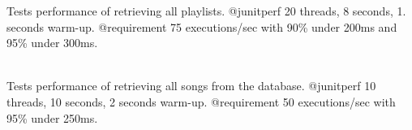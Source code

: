 \begin{DoxyRefList}
\label{test__test000076}%
%
Tests performance of retrieving all playlists. @junitperf 20 threads, 8 seconds, 1. seconds warm-\/up. @requirement 75 executions/sec with 90\% under 200ms and 95\% under 300ms.  
\item[{\parbox[t]{\linewidth}{Member \doxylink{classcom_1_1deusto_1_1deuspotify_1_1_deuspotify_perf_i_t_aeb6d9d92daf7457d86ee5d20a166aa72}{com.deusto.deuspotify.Deuspotify\+Perf\+IT.test\+Retrieve\+All\+Songs\+Performance} ()}}]\hfill \\
\label{test__test000075}%
%
Tests performance of retrieving all songs from the database. @junitperf 10 threads, 10 seconds, 2 seconds warm-\/up. @requirement 50 executions/sec with 95\% under 250ms. 
\end{DoxyRefList}